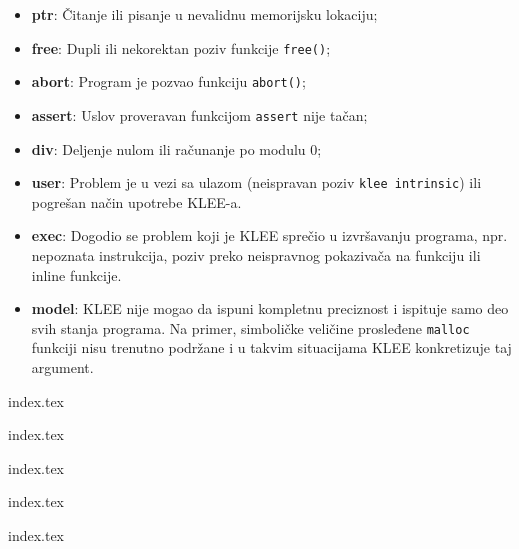 \begin{itemize}
\tightlist
\item
  \textbf{ptr}: Čitanje ili pisanje u nevalidnu memorijsku lokaciju;
\item
  \textbf{free}: Dupli ili nekorektan poziv funkcije \texttt{free()};
\item
  \textbf{abort}: Program je pozvao funkciju \texttt{abort()};
\item
  \textbf{assert}: Uslov proveravan funkcijom \texttt{assert} nije tačan;
\item
  \textbf{div}: Deljenje nulom ili računanje po modulu 0;
\item
  \textbf{user}: Problem je u vezi sa ulazom (neispravan poziv \texttt{klee\ intrinsic}) ili pogrešan način upotrebe KLEE-a.
\item
  \textbf{exec}: Dogodio se problem koji je KLEE sprečio u izvršavanju programa, npr. nepoznata instrukcija, poziv preko neispravnog pokazivača na funkciju ili inline funkcije.
\item
  \textbf{model}: KLEE nije mogao da ispuni kompletnu preciznost i ispituje samo deo svih stanja programa. Na primer, simboličke veličine prosleđene \texttt{malloc} funkciji nisu trenutno podržane i u takvim situacijama KLEE konkretizuje taj argument.
\end{itemize}

{index.tex}

{index.tex}

{index.tex}

{index.tex}

{index.tex}
